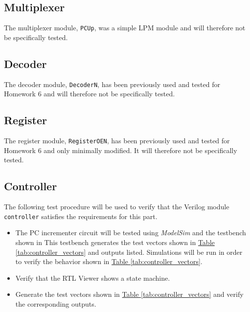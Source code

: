 \subsection{Multiplexer} %
\label{sub:multiplexer}

The multiplexer module, \verb|PCUp|, was a simple LPM module and will therefore not be specifically tested.


\subsection{Decoder} %
\label{sub:decoder}

The decoder module, \verb|DecoderN|, has been previously used and tested for Homework 6 and will therefore not be specifically tested.

\subsection{Register} %
\label{sub:register}

The register module, \verb|RegisterOEN|, has been previously used and tested for Homework 6 and only minimally modified.
It will therefore not be specifically tested.

\subsection{Controller} %
\label{sub:controller}

The following test procedure will be used to verify that the Verilog module \verb|controller| satisfies the requirements for this part.

\begin{itemize}
    \item The PC incrementer circuit will be tested using \emph{ModelSim} and the testbench shown in %
    This testbench generates the test vectors shown in \hyperref[tab:controller_vectors]{Table \ref*{tab:controller_vectors}} and outputs listed.
    Simulations will be run in order to verify the behavior shown in \hyperref[tab:controller_vectors]{Table \ref*{tab:controller_vectors}}.
    \item Verify that the RTL Viewer shows a state machine.
    \item Generate the test vectors shown in \hyperref[tab:controller_vectors]{Table \ref*{tab:controller_vectors}} and verify the corresponding outputs.
\end{itemize}

